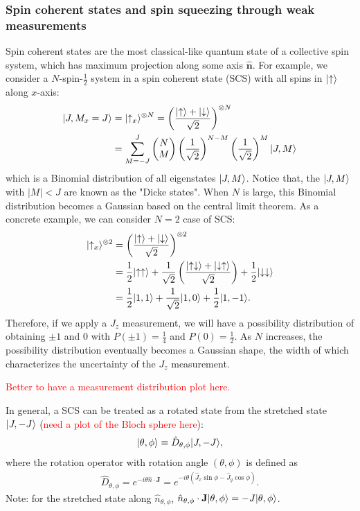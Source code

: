 \subsubsection{Spin coherent states and spin squeezing through weak measurements}
Spin coherent states are the most classical-like quantum state of a collective spin system, which has maximum projection along some axis $ \hat{\mathbf{n}} $. For example, we consider a $ N $-spin-$ \frac{1}{2} $ system in a spin coherent state (SCS) with all spins in $ \lvert{\uparrow}\rangle $ along $ x $-axis:
\begin{subequations}\label{eq:SCSJx}
\begin{align}
\lvert{J,M_x=J}\rangle &=\lvert{\uparrow_x}\rangle^{\otimes N} = \left(\frac{\lvert{\uparrow}\rangle+\lvert{\downarrow}\rangle}{\sqrt{2}}\right)^{\otimes N}\\
&= \sum_{M=-J}^J \left( \begin{matrix}N\\ M \end{matrix} \right) \left( \frac{1}{\sqrt{2}}\right)^{N-M} \left( \frac{1}{\sqrt{2}}\right)^{M} \lvert{J,M}\rangle
\end{align}
\end{subequations}
which is a Binomial distribution of all eigenstates $ \lvert{J,M}\rangle $. Notice that, the $ \lvert{J,M}\rangle $ with $ |M|<J $ are known as the "Dicke states". 
When $ N $ is large, this Binomial distribution becomes a Gaussian based on the central limit theorem. As a concrete example, we can consider $ N=2 $ case of SCS:
\begin{align}
\lvert{\uparrow_x}\rangle^{\otimes 2} &= \left(\frac{\lvert{\uparrow}\rangle+\lvert{\downarrow}\rangle}{\sqrt{2}}\right)^{\otimes 2}\\
&= \frac{1}{2}\lvert{\uparrow\uparrow}\rangle +\frac{1}{\sqrt{2}}\left(\frac{\lvert{\uparrow\downarrow}\rangle+\lvert{\downarrow\uparrow}\rangle}{\sqrt{2}} \right) + \frac{1}{2}\lvert{\downarrow\downarrow}\rangle\\
&= \frac{1}{2}\lvert{1,1}\rangle+\frac{1}{\sqrt{2}}\lvert{1,0}\rangle+\frac{1}{2}\lvert{1,-1}\rangle.
\end{align}
Therefore, if we apply a $ J_z $ measurement, we will have a possibility distribution of obtaining $ \pm 1 $ and $ 0 $ with $ P(\pm 1)=\frac{1}{4} $ and $ P(0)=\frac{1}{2} $. As $ N $ increases, the possibility distribution eventually becomes a Gaussian shape, the width of which characterizes the uncertainty of the $ J_z $ measurement. 

\textcolor{red}{Better to have a measurement distribution plot here.}

In general, a SCS can be treated as a rotated state from the stretched state $ \lvert{J,-J}\rangle $ (\textcolor{red}{need a plot of the Bloch sphere here}):
\begin{align}
\lvert{\theta,\phi}\rangle \equiv \hat{D}_{\theta,\phi} \lvert{J,-J}\rangle,
\end{align} 
where the rotation operator with rotation angle $ (\theta,\phi) $ is defined as
\begin{align}
\hat{D}_{\theta,\phi} =e^{-i\theta\hat{n}\cdot \mathbf{J}}=e^{-i\theta (\hat{J}_x\sin \phi - \hat{J}_y\cos \phi) }. 
\end{align}
Note: for the stretched state along $ \hat{n}_{\theta,\phi} $, $ \hat{n}_{\theta,\phi}\cdot \mathbf{J}\lvert{\theta,\phi}\rangle=-J\lvert{\theta,\phi}\rangle $. 

